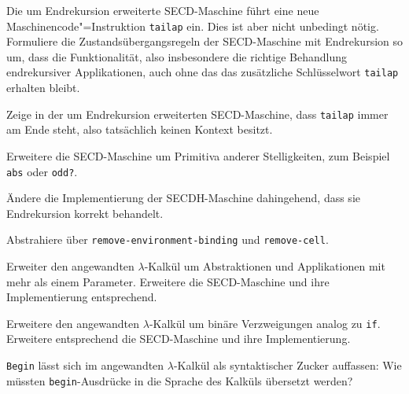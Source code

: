\begin{aufgabe}
  Die um Endrekursion erweiterte SECD-Maschine führt eine neue
  Maschinencode"=Instruktion \lstinline{tailap} ein.  Dies ist aber nicht
  unbedingt nötig.  Formuliere die Zustandsübergangsregeln der
  SECD-Maschine mit Endrekursion so um, dass die Funktionalität, also
  insbesondere die richtige Behandlung endrekursiver Applikationen,
  auch ohne das das zusätzliche Schlüsselwort \lstinline{tailap}
  erhalten bleibt.
\end{aufgabe}

\begin{aufgabe}
  Zeige in der um Endrekursion erweiterten
  SECD-Maschine, dass \lstinline{tailap} immer am Ende steht, also
  tatsächlich keinen Kontext besitzt.
\end{aufgabe}

\begin{aufgabe}\label{aufgabe:prim-arity}
  Erweitere die SECD-Maschine um Primitiva anderer Stelligkeiten,
  zum Beispiel \lstinline{abs} oder \lstinline{odd?}.
\end{aufgabe}

\begin{aufgabe}
  Ändere die Implementierung der SECDH-Maschine dahingehend, dass
  sie Endrekursion korrekt behandelt.
\end{aufgabe}

\begin{aufgabe}
  Abstrahiere über \lstinline{remove-environment-binding} und
  \lstinline{remove-cell}.
\end{aufgabe}

\begin{aufgabe}
  Erweiter den angewandten $\lambda$-Kalkül um Abstraktionen und
  Applikationen mit mehr als einem Parameter.  Erweitere die
  SECD-Maschine und ihre Implementierung entsprechend.
\end{aufgabe}


\begin{aufgabe}
  Erweitere den angewandten $\lambda$-Kalkül um binäre
  Verzweigungen analog zu \lstinline{if}.  Erweitere entsprechend die
  SECD-Maschine und ihre Implementierung.
\end{aufgabe}

\begin{aufgabe}
  \lstinline{Begin} lässt sich im angewandten $\lambda$-Kalkül als
  syntaktischer Zucker auffassen: Wie müssten \lstinline{begin}-Ausdrücke
  in die Sprache des Kalküls übersetzt werden?
\end{aufgabe}

